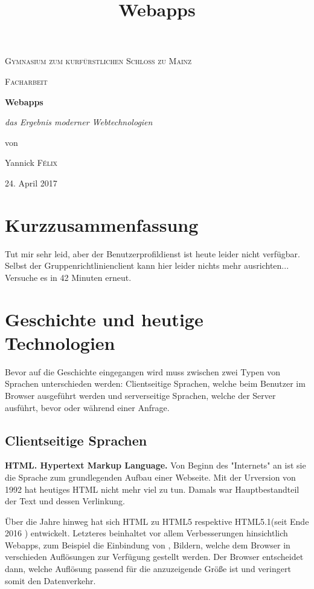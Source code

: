 \documentclass[a4paper,12pt]{scrartcl}      %
\title{Webapps}  %
\let\oldcite\cite
\renewcommand{\cite}[1]{\textsuperscript{\oldcite{#1}}}
\begin{document}
	
	\begin{titlepage}
		\centering
		{\scshape\LARGE Gymnasium zum kurf\"{u}rstlichen Schloss zu Mainz \par}
		\vspace{1cm}
		{\scshape\Large Facharbeit\par}
		\vspace{2.5cm}
		{\huge\bfseries Webapps\par}
		\vspace{1cm}
		{\Large\itshape das Ergebnis moderner Webtechnologien\par}
		\vfill
		von\par
		Yannick \textsc{F\'elix}
		
		\vfill
		
		{\large 24. April 2017 \par}
		\newpage
	\end{titlepage}
	
	\tableofcontents
	\vfill
	\doclicenseThis
	\newpage
	
	\section{Kurzzusammenfassung}
	Tut mir sehr leid, aber der Benutzerprofildienst ist heute leider nicht verfügbar.
	Selbst der Gruppenrichtlinienclient kann hier leider nichts mehr ausrichten...
	Versuche es in 42 Minuten erneut.
	
	\section{Geschichte und heutige Technologien}
	
	Bevor auf die Geschichte eingegangen wird muss zwischen zwei Typen von Sprachen unterschieden werden: Clientseitige Sprachen, welche beim Benutzer im Browser ausgeführt werden und serverseitige Sprachen, welche der Server ausführt, bevor oder während einer Anfrage. \par
	
	\subsection*{Clientseitige Sprachen}
	
	\textbf{HTML. Hypertext Markup Language.} Von Beginn des "Internets" an ist sie die Sprache zum grundlegenden Aufbau einer Webseite. Mit der Urversion von 1992 hat heutiges HTML nicht mehr viel zu tun. Damals war Hauptbestandteil der Text und dessen Verlinkung.\cite{htmlWiki}\par
	Über die Jahre hinweg hat sich HTML zu HTML5 respektive HTML5.1(seit Ende 2016 \cite{html51}) entwickelt. Letzteres beinhaltet vor allem Verbesserungen hinsichtlich Webapps, zum Beispiel die Einbindung von , Bildern, welche dem Browser in verschieden Auflösungen zur Verfügung gestellt werden. Der Browser entscheidet dann, welche Auflösung passend für die anzuzeigende Größe ist und veringert somit den Datenverkehr. \cite{html51blog}  \par
	
\end{document}
